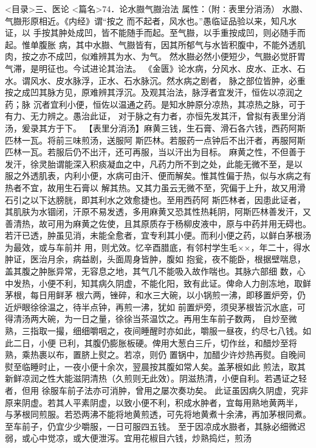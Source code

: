 \documentclass[a4paper,12pt,UTF8,twoside]{ctexbook}
\begin{document}
<目录>三、医论
<篇名>74．论水臌气臌治法
属性：（附∶表里分消汤） 
水臌、气臌形原相近。《内经》谓“按之 而不起者，风水也。”愚临证品验以来，知凡水证，以 
手按其肿处成凹，皆不能随手而起。至气臌，以手重按成凹，则必随手而起。惟单腹胀 
病，其中水臌、气臌皆有，因其所郁气与水皆积腹中，不能外透肌肉，按之亦不成凹，似难辨其为水、为气。 
然水臌必然小便短少，气臌必觉肝胃气滞，是明征也。今试进论其治法。 
《金匮》论水病，分风水、皮水、正水、石水。谓风水、皮水脉浮，正水、石水脉沉。然水病之剧者， 
脉之部位皆肿，必重按之成凹其脉方见，原难辨其浮沉。及观其治法，脉浮者宜发汗，恒佐以凉润之药；脉 
沉者宜利小便，恒佐以温通之药。是知水肿原分凉热，其凉热之脉，可于有力、无力辨之。愚治此证， 
对于脉之有力者，亦恒先发其汗，曾拟有表里分消汤，爰录其方于下。 
【表里分消汤】麻黄三钱，生石膏、滑石各六钱，西药阿斯匹林一瓦。将前三味煎汤，送服阿 
斯匹林。若服药一点钟后不出汗者，再服阿斯匹林一瓦。若服后仍不出汗，还可再服，当以汗出为目标。 
麻黄之性，不但善于发汗，徐灵胎谓能深入积痰凝血之中，凡药力所不到之处，此能无微不至，是以 
服之外透肌表，内利小便，水病可由汗、便而解矣。惟其性偏于热，似与水病之有热者不宜，故用生石膏以 
解其热。又其力虽云无微不至，究偏于上升，故又用滑石引之以下达膀胱，即其利水之效愈捷也。至用西药阿 
斯匹林者，因患此证者，其肌肤为水锢闭，汗原不易发透，多用麻黄又恐其性热耗阴，阿斯匹林善发汗，又 
善清热，故可用为麻黄之佐使，且其原质存于杨柳皮液中，原与中药并用无碍也。 
若汗已透，肿虽见消，未能全愈者，宜专利其小便。而利小便之药，以鲜白茅根汤为最效，或与车前并 
用，则尤效。忆辛酉腊底，有邻村学生毛××，年二十，得水肿证，医治月余，病益剧，头面周身皆肿，腹如 
抱瓮，夜不能卧，根据壁喘息，盖其腹之肿胀异常，无容息之地，其气几不能吸入故作喘也。其脉六部细 
数，心中发热，小便不利，知其病久阴虚，不能化阳，致有此证。俾命人力剖冻地，取鲜茅根，每日用鲜茅 
根六两，锉碎，和水三大碗，以小锅煎一沸，即移置炉旁，仍近炉眼徐徐温之，待半点钟，再煎一沸，犹如 
前置炉旁，须臾茅根皆沉水底，可得清汤两大碗，为一日之量，徐徐当茶温饮之。再用生车前子数两， 
自炒至微熟，三指取一撮，细细嚼咽之，夜间睡醒时亦如此，嚼服一昼夜，约尽七八钱。如此二日，小便 
已利，其腹仍膨胀板硬。俾用大葱白三斤，切作丝，和醋炒至将熟，乘热裹以布，置脐上熨之。若凉，则仍 
置锅中，加醋少许炒热再熨。自晚间熨至临睡时止，一夜小便十余次，翌晨按其腹如常人矣。盖茅根如此 
煎法，取其新鲜凉润之性大能滋阴清热（久煎则无此效）。阴滋热清，小便自利。若遇证之轻者，但用 
徐服车前子法亦可消肿，曾用之屡次奏功矣。 
此证虽因病久阴虚，究非原来阴虚。若其人平素阴虚，以致小便不利，积成水肿者，宜每用熟地黄两半， 
与茅根同煎服。若恐两沸不能将地黄煎透，可先将地黄煮十余沸，再加茅根同煮。 
至车前子，仍宜少少嚼服，一日可服四五钱。 
至于因凉成水臌者，其脉必细微迟弱，或心中觉凉，或大便泄泻。宜用花椒目六钱，炒熟捣烂，煎汤 
\end{document}
